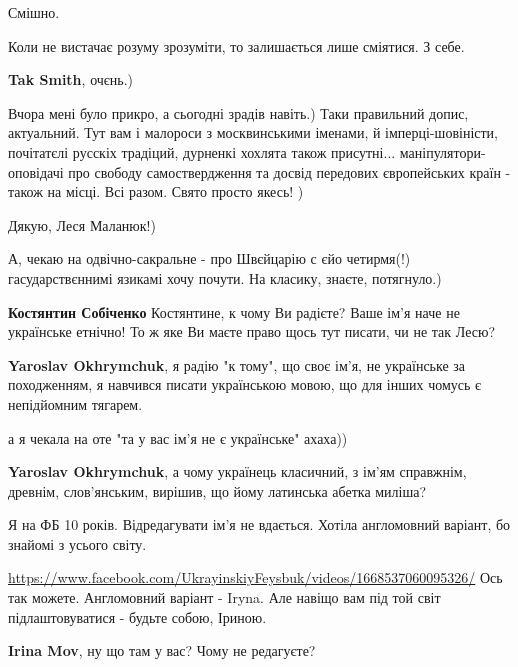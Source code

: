 \begin{itemize}
Смішно.

\begin{itemize} %
Коли не вистачає розуму зрозуміти, то залишається лише сміятися. З себе.

\textbf{Tak Smith}, очєнь.)
\end{itemize} %


Вчора мені було прикро, а сьогодні зрадів навіть.) Таки правильний допис,
актуальний. Тут вам і малороси з москвинськими іменами, й імперці-шовіністи,
почітатєлі русскіх традіций, дурненкі хохлята також присутні...
маніпулятори-оповідачі про свободу самоствердження та досвід передових
європейських країн - також на місці. Всі разом. Свято просто якесь! )

Дякую, Леся Маланюк!)

А, чекаю на одвічно-сакральне - про Швєйцарію с єйо четирмя(!) гасударствєннимі
язикамі хочу почути. На класику, знаєте, потягнуло.)

\begin{itemize} %
\textbf{Костянтин Собіченко} Костянтине, к чому Ви радієте? Ваше ім’я наче не українське етнічно! То ж яке Ви маєте право щось тут писати, чи не так Лесю?

\textbf{Yaroslav Okhrymchuk}, я радію "к тому", що своє ім'я, не українське за походженням, я навчився писати українською мовою, що для інших чомусь є непідйомним тягарем.

а я чекала на оте "та у вас ім'я не є українське" ахаха))

\textbf{Yaroslav Okhrymchuk}, а чому українець класичний, з ім'ям справжнім, древнім, слов'янським, вирішив, що йому латинська абетка миліша?
\end{itemize} %

Я на ФБ 10 років. Відредагувати ім'я не вдається. Хотіла англомовний варіант,
бо знайомі з усього світу.

\begin{itemize} %
\url{https://www.facebook.com/UkrayinskiyFeysbuk/videos/1668537060095326/}
Ось так можете. Англомовний варіант - Iryna. Але навіщо вам під той світ підлаштовуватися - будьте собою, Іриною.

\textbf{Irina Mov}, ну що там у вас? Чому не редагуєте?
\end{itemize} %


\end{itemize}
